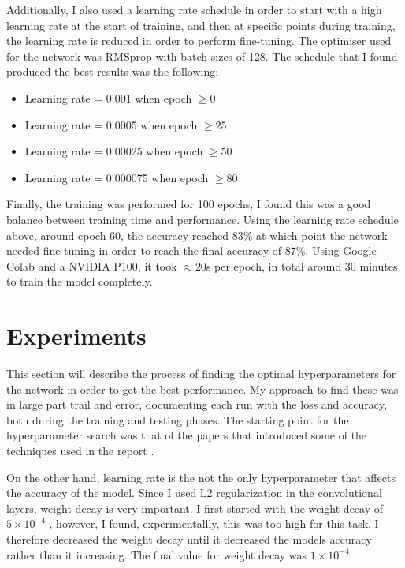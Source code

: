 \documentclass[12pt]{article}
\begin{document}
Additionally, I also used a learning rate schedule in order to start with a high learning rate at the start of training, and then at specific points during training, the learning rate is reduced in order to perform fine-tuning. The optimiser used for the network was RMSprop with batch sizes of 128. The schedule that I found produced the best results was the following:

\begin{itemize}
  \item Learning rate = 0.001 when epoch $\geq 0$
  \item Learning rate = 0.0005 when epoch $\ge 25$
  \item Learning rate = 0.00025 when epoch $\ge 50$
  \item Learning rate = 0.000075 when epoch $\ge 80$
\end{itemize}

Finally, the training was performed for 100 epochs, I found this was a good balance between training time and performance. Using the learning rate schedule above, around epoch 60, the accuracy reached 83\% at which point the network needed fine tuning in order to reach the final accuracy of 87\%. Using Google Colab and a NVIDIA P100, it took $\approx 20$s per epoch, in total around 30 minutes to train the model completely.

\section{Experiments}
This section will describe the process of finding the optimal hyperparameters for the network in order to get the best performance. My approach to find these was in large part trail and error, documenting each run with the loss and accuracy, both during the training and testing phases. The starting point for the hyperparameter search was that of the papers that introduced some of the techniques used in the report \cite{simonyan2014deep}.

On the other hand, learning rate is the not the only hyperparameter that affects the accuracy of the model. Since I used L2 regularization in the convolutional layers, weight decay is very important. I first started with the weight decay of $5\times 10^{-4}$ \cite{simonyan2014deep}, however, I found, experimentallly, this was too high for this task. I therefore decreased the weight decay until it decreased the models accuracy rather than it increasing. The final value for weight decay was $1\times 10^{-4}$.
\end{document}
